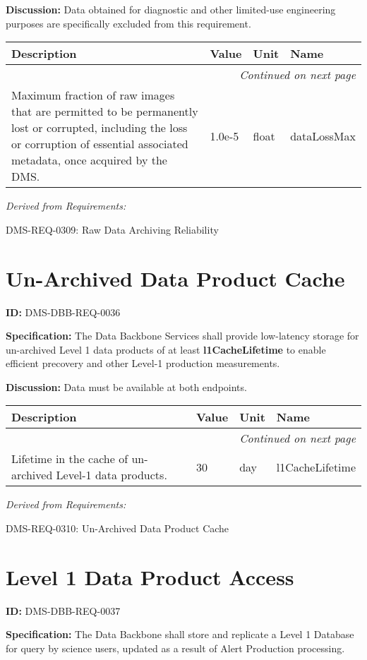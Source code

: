 \documentclass[SE,toc,lsstdraft]{lsstdoc}
\makeatletter
\newcommand{\paramname}[1]{\hspace{0pt}#1}
\newcommand{\unitname}[1]{\hspace{0pt}#1}
\newenvironment{parameters}[0]{%
\setlength\LTleft{0pt}
\setlength\LTright{\fill}
\begin{small}
\begin{longtable}[]{|p{0.49\textwidth}|l|p{0.6in}|p{1.70in}@{}|}

\hline \textbf{Description} & \textbf{Value} & \textbf{Unit} & \textbf{Name} \\ \hline
\endhead

\hline \multicolumn{4}{r}{\emph{Continued on next page}} \\
\endfoot

\hline\hline
\endlastfoot
}{%
\hline
\end{longtable}
\end{small}
}
\makeatother
\begin{document}
\textbf{Discussion:}
Data obtained for diagnostic and other limited-use engineering purposes are specifically excluded from this requirement.

\begin{parameters}
Maximum fraction of raw images that are permitted to be permanently lost or corrupted, including the loss or corruption of essential associated metadata, once acquired by the DMS.
&
1.0e-5
&
\unitname{%
float
}
&
\paramname{%
dataLossMax
} \\\hline
\end{parameters}

\emph{Derived from Requirements:}

DMS-REQ-0309:
Raw Data Archiving Reliability \newline

\section{Un-Archived Data Product Cache}

\label{DMS-DBB-REQ-0036}
\textbf{ID:} DMS-DBB-REQ-0036

\textbf{Specification:}
The Data Backbone Services shall provide low-latency storage for un-archived Level 1 data products of at least \textbf{l1CacheLifetime} to enable efficient precovery and other Level-1 production measurements.

\textbf{Discussion:}
Data must be available at both endpoints.

\begin{parameters}
Lifetime in the cache of un-archived Level-1 data products.
&
30
&
\unitname{%
day
}
&
\paramname{%
l1CacheLifetime
} \\\hline
\end{parameters}

\emph{Derived from Requirements:}

DMS-REQ-0310:
Un-Archived Data Product Cache \newline

\section{Level 1 Data Product Access}

\label{DMS-DBB-REQ-0037}
\textbf{ID:} DMS-DBB-REQ-0037

\textbf{Specification:}
The Data Backbone shall store and replicate a Level 1 Database for query by science users, updated as a result of Alert Production processing.
\end{document}
